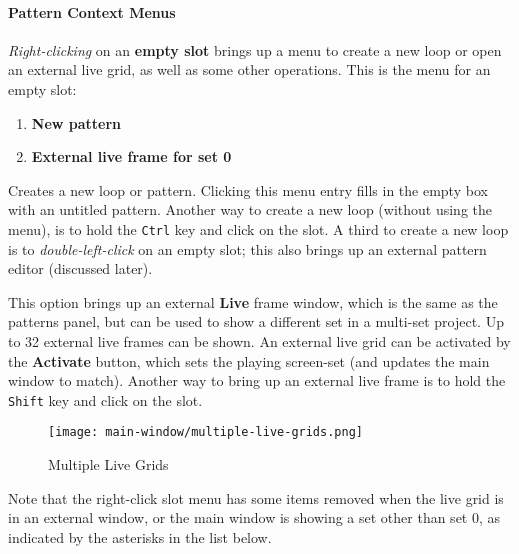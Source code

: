 \paragraph{Pattern Context Menus}
\label{paragraph:patterns_context_menus}

   \textsl{Right-clicking} on an \textbf{empty slot} brings up a menu to create
   a new loop or open an external live grid, as well as some other operations.
   This is the menu for an empty slot:

   \begin{enumerate}
      \item \textbf{New pattern}
      \item \textbf{External live frame for set 0}
   \end{enumerate}

   \setcounter{ItemCounter}{0}      %

   Creates a new loop or pattern.
   Clicking this menu entry fills in the empty box with an untitled
   pattern.
   Another way to create a new loop (without using the menu), is
   to hold the \texttt{Ctrl} key and click on the slot.
   A third to create a new loop is to
   \textsl{double-left-click} on an
   empty slot; this also brings up an external pattern editor (discussed
   later).

   This option brings up an external \textbf{Live} frame window, which
   is the same as the patterns panel, but can be used to show a different set
   in a multi-set project.  Up to 32 external live frames can be shown.
   An external live grid can be activated by the \textbf{Activate} button,
   which sets the playing screen-set
   (and updates the main window to match).
   Another way to bring up an external live frame
   is to hold the \texttt{Shift} key and click on the slot.


\begin{figure}[H]
   \centering 
   \texttt{[image: main-window/multiple-live-grids.png]}
   \caption{Multiple Live Grids}
   \label{fig:multiple_live_grids}
\end{figure}

   Note that the right-click slot menu has some items removed when the live
   grid is in an external window, or the main window is showing a set other
   than set 0, as indicated by the asterisks in the list below.

